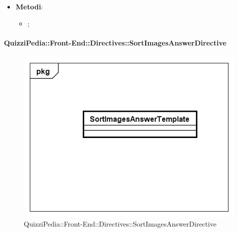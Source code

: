 \begin{itemize}
\begin{itemize}
			\end{itemize}
			 
			\item \textbf{Metodi}: 
			\begin{itemize}
				\item ;
			\end{itemize}
		\end{itemize}
		
		\paragraph{QuizziPedia::Front-End::Directives::SortImagesAnswerDirective}
		
		\label{QuizziPedia::Front-End::Directives::SortImagesAnswerDirective}
		
		\begin{figure}[ht]
			\centering
			\includegraphics[scale=0.5,keepaspectratio]{UML/Classi/Front-End/QuizziPedia_Front-end_Templates_SortImagesAnswerTemplate.png}
			\caption{QuizziPedia::Front-End::Directives::SortImagesAnswerDirective}
		\end{figure} \FloatBarrier
		
